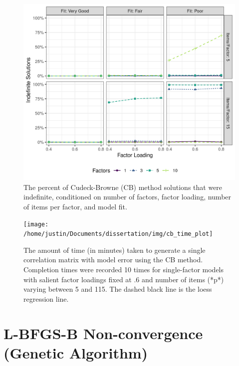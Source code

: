 \documentclass[11pt]{umnthesis}
\begin{document}
\begin{figure}

{\centering \includegraphics[width=0.8\linewidth]{img/cb_percent_indefinite} 

}

\caption[The percent of Cudeck-Browne (CB) method solutions that were indefinite, conditioned on number of factors, factor loading, number of items per factor, and model fit]{The percent of Cudeck-Browne (CB) method solutions that were indefinite, conditioned on number of factors, factor loading, number of items per factor, and model fit.}\label{fig:fig-percent-indefinite-matrices}
\end{figure}

\begin{figure}

{\centering \texttt{[image: /home/justin/Documents/dissertation/img/cb\_time\_plot]} 

}

\caption[The amount of time (in minutes) taken to generate a single correlation matrix with model error using the CB method]{The amount of time (in minutes) taken to generate a single correlation matrix with model error using the CB method. Completion times were recorded 10 times for single-factor models with salient factor loadings fixed at .6 and number of items (*p*) varying between 5 and 115. The dashed black line is the loess regression line.}\label{fig:cb-completion-time}
\end{figure}

\hypertarget{l-bfgs-b-non-convergence-genetic-algorithm}{%
\section{L-BFGS-B Non-convergence (Genetic Algorithm)}\label{l-bfgs-b-non-convergence-genetic-algorithm}}
\end{document}
